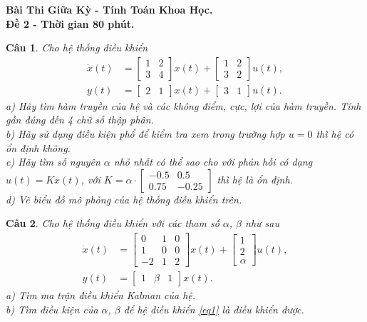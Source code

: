 \documentclass[11pt]{article}
\newtheorem{bt}{Câu}
\def\a{\alpha}
\def\b{\beta}
\newcommand{\m}[1]{
	\begin{bmatrix}
		#1
	\end{bmatrix}
}
\begin{document}



\begin{center}
	{\bf Bài Thi Giữa Kỳ - Tính Toán Khoa Học. \\ Đề 2 - Thời gian 80 phút.
	 }
\end{center}

\begin{bt}\label{Câu 1}
Cho hệ thống điều khiển
%
\begin{align}\label{eq0}
	\dot{x}(t) &= \m{1 & 2 \\ 3 & 4} x(t) + \m{1 & 2 \\ 3 & 2} u(t), \\
	y(t) &= \m{2 & 1} x(t) + \m{3 & 1} u(t). 
\end{align}
%
a) Hãy tìm hàm truyền của hệ và các không điểm, cực, lợi của hàm truyền. Tính gần đúng đến 4 chữ số thập phân. \\
b) Hãy sử dụng điều kiện phổ để kiểm tra xem trong trường hợp $u=0$ thì hệ có ổn định không. \\
c) Hãy tìm số nguyên $\a$ nhỏ nhất có thể sao cho với phản hồi có dạng $u(t) = K x(t)$, với $K = \a \cdot \m{ -0.5 & 0.5 \\ 0.75 & -0.25}$ thì hệ là ổn định. \\ 
d) Vẽ biểu đồ mô phỏng của hệ thống điều khiển trên.
\end{bt}

\begin{bt}
Cho hệ thống điều khiển với các tham số $\a$, $\b$ như sau
%
\begin{align}\label{eq1}
	\dot{x}(t) &= \m{0 & 1 & 0 \\ 1 & 0 & 0 \\ -2 & 1 & 2} x(t) + \m{1 \\ 2 \\ \a} u(t), \\
	y(t) &= \m{1 & \b & 1} x(t). 
\end{align}
%
a) Tìm ma trận điều khiển Kalman của hệ. \\
b) Tìm điều kiện của $\a$, $\b$ để hệ điều khiển \eqref{eq1} là điều khiển được. \\
\end{bt}
\end{document}
